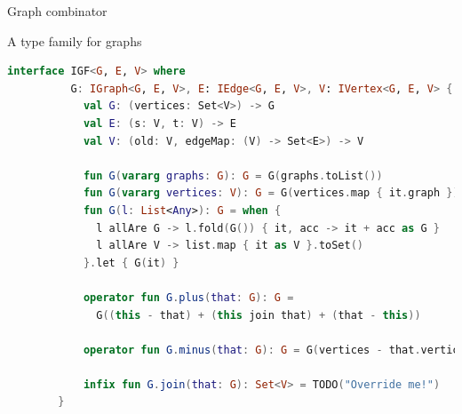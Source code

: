 \documentclass{beamer}
\begin{document}
\begin{frame}[fragile]{Graph combinator}
\begin{figure}[H]
\begin{center}
{
  \hspace{5em}
 }
  \end{center}
\end{figure}
    \end{frame}

    \begin{frame}[fragile]{A type family for graphs}
        \begin{lstlisting}[language=Kotlin, gobble=8]
        interface IGF<G, E, V> where
          G: IGraph<G, E, V>, E: IEdge<G, E, V>, V: IVertex<G, E, V> {
            val G: (vertices: Set<V>) -> G
            val E: (s: V, t: V) -> E
            val V: (old: V, edgeMap: (V) -> Set<E>) -> V

            fun G(vararg graphs: G): G = G(graphs.toList())
            fun G(vararg vertices: V): G = G(vertices.map { it.graph })
            fun G(l: List<Any>): G = when {
              l allAre G -> l.fold(G()) { it, acc -> it + acc as G }
              l allAre V -> list.map { it as V }.toSet()
            }.let { G(it) }

            operator fun G.plus(that: G): G =
              G((this - that) + (this join that) + (that - this))

            operator fun G.minus(that: G): G = G(vertices - that.vertices)

            infix fun G.join(that: G): Set<V> = TODO("Override me!")
        }
        \end{lstlisting}
    \end{frame}
\end{document}
